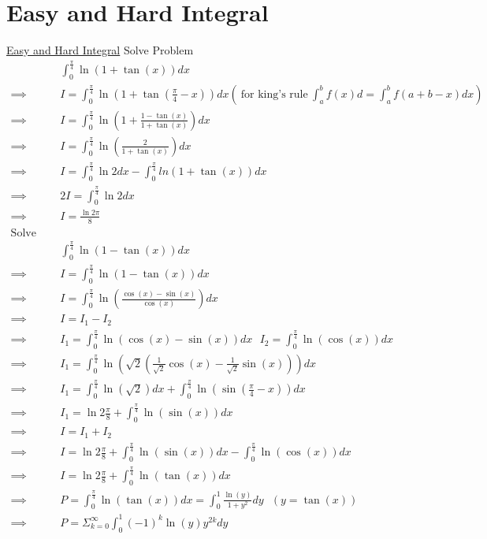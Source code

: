 \documentclass {article}
\begin{document}
\section{Easy and Hard Integral}
\href{https://www.youtube.com/watch?v=o4TR62QvQJU}{Easy and Hard Integral}
Solve Problem \\
\[
\begin{matrix}
     & \int_0^{\frac{\pi}{4}} \ln\left(1 + \tan\left(x\right)\right){d}x  \\
\implies &  I = \int_0^{\frac{\pi}{4}} \ln\left(1 + \tan\left(\frac{\pi}{4} - x\right)\right){d}x  
  \left( \ \text{for king's rule}\ \int_a^b f(x){d} = \int_a^b f(a+b-x) {d}x \right) \\
\implies & I = \int_0^{\frac{\pi}{4}} \ln\left( 1 + \frac{1 - \tan(x)}{1+ \tan(x)} \right) {d}x \\
\implies & I = \int_0^{\frac{\pi}{4}} \ln\left(\frac {2}{1 + \tan(x)}\right) {d}x \\
\implies & I = \int_0^{\frac{\pi}{4}} \ln2 {d}x - \int_0^{\frac{\pi}{4}} ln\left(1 + \tan(x)\right) {d}x \\
\implies & 2I = \int_0^{\frac{\pi}{4}} \ln2 {d}x \\
\implies & I = \frac{\ln2\pi}{8} \\

\text{Solve Problem} \\
 & \int_0^{\frac{\pi}{4}} \ln\left(1 - \tan\left(x\right)\right){d}x  \\
\implies & I = \int_0^{\frac{\pi}{4}} \ln\left(1 - \tan\left(x\right)\right){d}x \\
\implies & I = \int_0^{\frac{\pi}{4}} \ln\left(\frac {\cos(x) - \sin(x)}{\cos(x)}\right){d}x \\
\implies & I = I_1 - I_2 \\
\implies & I_1 = \int_0^{\frac{\pi}{4}} \ln\left(\cos(x) - \sin(x)\right){d}x \text{ } I_2 = \int_0^{\frac{\pi}{4}} \ln\left(\cos(x)\right){d}x \\
\implies & I_1 = \int_0^{\frac{\pi}{4}} \ln\left(\sqrt{2}\left(\frac{1}{\sqrt{2} }\cos(x) - \frac{1}{\sqrt{2}}\sin(x)\right)\right){d}x \\
\implies & I_1 = \int_0^{\frac{\pi}{4}} \ln(\sqrt{2}){d}x + \int_0^{\frac{\pi}{4}}\ln\left(\sin(\frac{\pi}{4} - x)\right){d}x\\
\implies & I_1 = \ln2 \frac{\pi}{8} + \int_0^{\frac{\pi}{4}}\ln\left(\sin(x)\right){d}x \\
\implies & I = I_1 + I_2 \\
\implies & I = \ln2 \frac{\pi}{8} + \int_0^{\frac{\pi}{4}}\ln\left(\sin(x)\right){d}x - \int_0^{\frac{\pi}{4}} \ln\left(\cos(x)\right){d}x \\
\implies & I = \ln2 \frac{\pi}{8} + \int_0^{\frac{\pi}{4}} \ln(\tan(x)){d}x \\
\implies & P = \int_0^{\frac{\pi}{4}}\ln(\tan(x)){d}x = \int_0^{1} \frac{\ln(y)} {1 + y^2}{d}y \text{ } \left(y = \tan(x)\right) \\
\implies & P = \displaystyle\Sigma_{k=0}^{\infty} \int_0^1(-1)^k \ln(y)y^{2k} {d}y \\
\end{matrix}
\]
\end{document}
